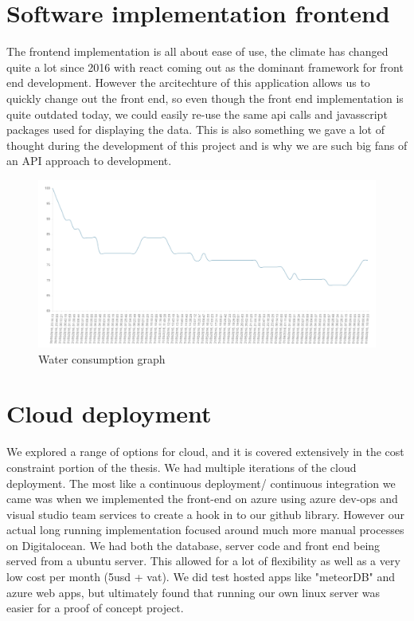 \documentclass[]{uiophd}
\begin{document}
\section{Software implementation frontend}
The frontend implementation is all about ease of use, the climate has changed quite a lot since 2016 with react coming out as the dominant framework for front end development. However the arcitechture of this application allows us to quickly change out the front end, so even though the front end implementation is quite outdated today, we could easily re-use the same api calls and javasscript packages used for displaying the data. This is also something we gave a lot of thought during the development of this project and is why we are such big fans of an API approach to development. 

 \begin{figure}[h]
\caption{Water consumption graph}
\centering
\includegraphics[width=12cm]{watergraph.png}
\end{figure}

\section{Cloud deployment}
We explored a range of options for cloud, and it is covered extensively in the cost constraint portion of the thesis. We had multiple iterations of the cloud deployment. The most like a continuous deployment/ continuous integration we came was when we implemented the front-end on azure using azure dev-ops and visual studio team services to create a hook in to our github library. However our actual long running implementation focused around much more manual processes on Digitalocean. We had both the database, server code and front end being served from a ubuntu server. This allowed for a lot of flexibility as well as a very low cost per month (5usd + vat). We did test hosted apps like "meteorDB" and azure web apps, but ultimately found that running our own linux server was easier for a proof of concept project.
\end{document}
